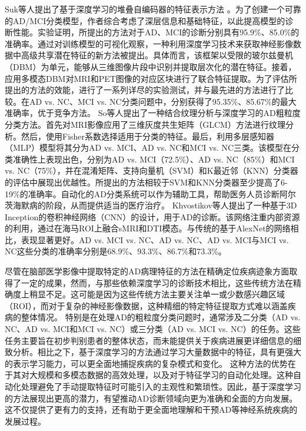 Suk等人\cite{suk2013deep}提出了基于深度学习的堆叠自编码器的特征表示方法
。为了创建一个可靠的AD/MCI分类模型，作者综合考虑了深层信息和基础特征，以此提高模型的诊断性能。实验证明，所提出的方法对于AD、MCI的诊断分别具有95.9\%、85.0\%的准确率。通过对训练模型的可视化观察，一种利用深度学习技术来获取神经影像数据中高级共享潜在特征的新方法被提出\cite{suk2014hierarchical}。具体而言，该框架以受限的玻尔兹曼机（DBM）为单元，能够从三维图像片段中识别并提取层次化的潜在特征。接着，应用多模态DBM对MRI和PET图像的对应区块进行了联合特征提取。为了评估所提出的方法的效能，进行了一系列详尽的实验测试，并与最先进的方法进行了比较。在AD vs. NC、MCI vs. NC分类问题中，分别获得了95.35\%、85.67\%的最大准确率，优于竞争方法。
So等人\cite{so2019deep}提出了一种结合纹理分析与深度学习的AD粗粒度分类方法。首先对MRI影像应用了三维灰度共生矩阵（GLCM）方法进行纹理分析。然后，使用Fisher系数选择适用于分类的特征。最后，利用多层感知器（MLP）模型将其分为AD vs. MCI、AD vs. NC和MCI vs. NC三类。该模型在分类准确性上表现出色，分别为AD vs. MCI（72.5\%）、AD vs. NC（85\%）和MCI vs. NC（75\%），并在混淆矩阵、支持向量机（SVM）和K最近邻（KNN）分类器的评估中展现出优越性。所提出的方法相较于SVM和KNN分类器至少提高了6-19\%的准确率。自动化的AD分类系统可以作为辅助工具，帮助医务人员诊断阿尔茨海默病的阶段，从而提供适当的医疗治疗。 
Khvostikov等人\cite{khvostikov20183d}提出了一种基于3D Inception的卷积神经网络（CNN）的设计，用于AD的诊断。该网络注重内部资源的利用，通过在海马ROI上融合sMRI和DTI模态。与传统的基于AlexNet的网络相比，表现显著更好。AD vs. MCI vs. NC、AD vs. NC、AD vs. MCI与MCI vs. NC这些分类的准确率分别是68.9\%、93.3\%、86.7\%和73.3\%。

尽管在脑部医学影像中提取特定的AD病理特征的方法在精确定位疾病迹象方面取得了一定的成果，然而，与那些依赖深度学习的诊断技术相比，这些传统方法在精确度上稍显不足。这可能是因为这些传统方法主要关注单一或少数感兴趣区域（ROI），而对于复杂的神经影像数据，这种精细的特定特征提取方式难以涵盖疾病的整体情况。
特别是在处理AD的粗粒度分类问题时，通常涉及二分类（AD vs. NC、AD vs. MCI和MCI vs. NC）或三分类（AD vs. MCI vs. NC）的任务。这些任务主要旨在初步判别患者的整体状态，而未能提供关于疾病进展更详细信息的细致分析。相比之下，基于深度学习的方法通过学习大量数据中的特征，具有更强大的表示学习能力，可以更全面地捕捉疾病的复杂模式和变化。
这种方法的优势在于其对大规模和多模态数据的高效处理，以及对于特征学习的自动化处理。这种自动化处理避免了手动提取特征时可能引入的主观性和繁琐性。因此，基于深度学习的方法展现出更高的潜力，有望推动AD诊断领域向更为准确和全面的方向发展。这不仅提供了更有力的支持，还有助于更全面地理解和干预AD等神经系统疾病的发展过程。
    
